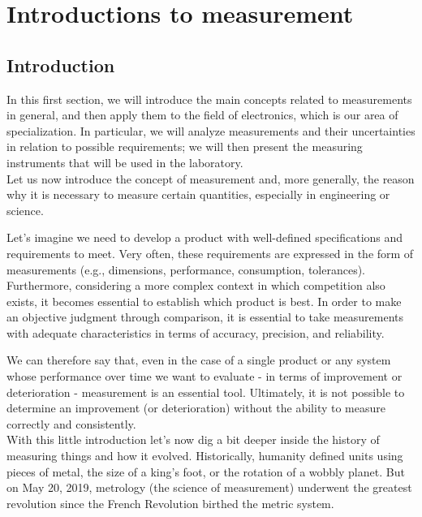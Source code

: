 \documentclass[../main.tex]{subfiles}
\begin{document}
\clearpage
\thispagestyle{empty}
\vspace*{7cm}
\section{Introductions to measurement}
\vspace*{1.5cm}

\subsection{Introduction}

In this first section, we will introduce the main concepts related to measurements in general, and then apply them to the field of electronics, which is our area of specialization. In particular, we will analyze measurements and their uncertainties in relation to possible requirements; we will then present the measuring instruments that will be used in the laboratory.\\

Let us now introduce the concept of measurement and, more generally, the reason why it is necessary to measure certain quantities, especially in engineering or science.

Let's imagine we need to develop a product with well-defined specifications and requirements to meet. Very often, these requirements are expressed in the form of measurements (e.g., dimensions, performance, consumption, tolerances). Furthermore, considering a more complex context in which competition also exists, it becomes essential to establish which product is best. In order to make an objective judgment through comparison, it is essential to take measurements with adequate characteristics in terms of accuracy, precision, and reliability.

We can therefore say that, even in the case of a single product or any system whose performance over time we want to evaluate - in terms of improvement or deterioration - measurement is an essential tool. Ultimately, it is not possible to determine an improvement (or deterioration) without the ability to measure correctly and consistently.\\

With this little introduction let's now dig a bit deeper inside the history of measuring things and how it evolved. Historically, humanity defined units using pieces of metal, the size of a king's foot, or the rotation of a wobbly planet. But on May 20, 2019, metrology (the science of measurement) underwent the greatest revolution since the French Revolution birthed the metric system.
\end{document}
